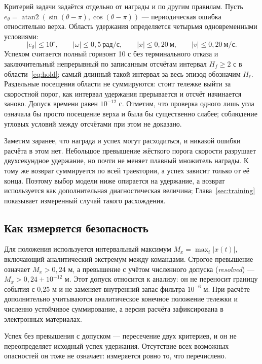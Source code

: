 Критерий задачи задаётся отдельно от награды и по другим правилам. Пусть $e_\theta=\operatorname{atan2}(\sin(\theta-\pi),\cos(\theta-\pi))$ — периодическая ошибка относительно верха. Область удержания определяется четырьмя одновременными условиями:
\begin{equation}
|e_\theta|\leq10^\circ,\qquad |\omega|\leq0{,}5\ \text{рад/с},\qquad
|x|\leq0{,}20\ \text{м},\qquad |v|\leq0{,}20\ \text{м/с}.
\label{eq:hold}
\end{equation}
Успехом считается полный горизонт 10 с без терминального отказа и заключительный непрерывный по записанным отсчётам интервал $H_f\geq2$ с в области~\eqref{eq:hold}; самый длинный такой интервал за весь эпизод обозначим $H_\ell$. Раздельные посещения области не суммируются: стоит тележке выйти за скоростной порог, как интервал удержания прерывается и отсчёт начинается заново. Допуск времени равен $10^{-12}$ с. Отметим, что проверка одного лишь угла означала бы просто посещение верха и была бы существенно слабее; соблюдение угловых условий между отсчётами при этом не доказано.

Заметим заранее, что награда и успех могут расходиться, и никакой ошибки расчёта в этом нет. Небольшое превышение жёсткого порога скорости разрушает двухсекундное удержание, но почти не меняет плавный множитель награды. К тому же возврат суммируется по всей траектории, а успех зависит только от её конца. Поэтому выбор модели ниже опирается на удержание, а возврат используется как дополнительная диагностическая величина; Глава~\ref{sec:training} показывает измеренный случай такого расхождения.

\subsection{Как измеряется безопасность}
Для положения используется интервальный максимум $M_x=\max_t|x(t)|$, включающий аналитический экстремум между командами. Строгое превышение означает $M_x>0{,}24$ м, а превышение с учётом численного допуска (\emph{resolved}) — $M_x>0{,}24+10^{-12}$ м. Этот допуск относится к анализу: он не переносит границу события с 0,25 м и не заменяет внутренний запас фильтра $10^{-6}$ м. При расчёте дополнительно учитываются аналитическое конечное положение тележки и численно устойчивое суммирование, а версия расчёта зафиксирована в электронных материалах.

Успех без превышения с допуском — пересечение двух критериев, и он не переопределяет исходный успех удержания. Отсутствие всех возможных опасностей он тоже не означает: измеряется ровно то, что перечислено.


